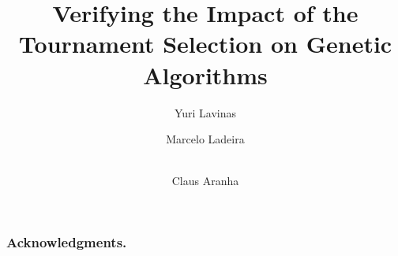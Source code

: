 \documentclass{article}
\begin{document}
\title{Verifying the Impact of the Tournament Selection on Genetic Algorithms}

\author{
  Yuri Lavinas \and
  Marcelo Ladeira \and \\ 
  Claus Aranha
}


\begin{abstract}

\end{abstract}


 
%





\subsubsection*{Acknowledgments.} 



\end{document}
